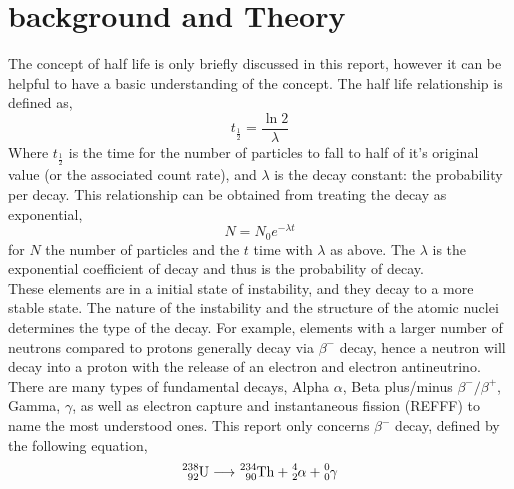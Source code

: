 \documentclass[11pt]{article}
\begin{document}
    
    \section{background and Theory}
    The concept of half life is only briefly discussed in this report, however it can be helpful to have a basic understanding of the concept. The half life relationship is defined as,
    \begin{equation}
        t_{\frac{1}{2}} = \frac{\ln{2}}{\lambda}
    \end{equation}
    Where $ t_{\frac{1}{2}}$ is the time for the number of particles to fall to half of it's original value (or the associated count rate), and $\lambda$ is the decay constant: the probability per decay. This relationship can be obtained from treating the decay as exponential, 
    $$N = N_0 e^{-\lambda t}$$
    for $N$ the number of particles and the $t$ time with $\lambda$ as above.  The $\lambda$ is the exponential coefficient of decay and thus is the probability of decay. 
   \\
   These elements are in a initial state of instability, and they decay to a more stable state. The nature of the instability and the structure of the atomic nuclei determines the type of the decay. For example, elements with a larger number of neutrons compared to protons generally decay via $\beta^{-}$ decay, hence a neutron will decay into a proton with the release of an electron and electron antineutrino. 
   There are many types of fundamental decays, Alpha $\alpha$, Beta plus/minus $\beta^{-}/\beta^{+}$, Gamma, $\gamma$, as well as electron capture and instantaneous fission (REFFF) to name the most understood ones. This report only concerns $\beta^{-}$ decay, defined by the following equation,
    $$ \ce{^{238}_{92}U} \longrightarrow \ce{^{234}_{90}Th} + \ce{^{4}_{2}\alpha} + \ce{^{0}_{0}\gamma}$$
\end{document}
